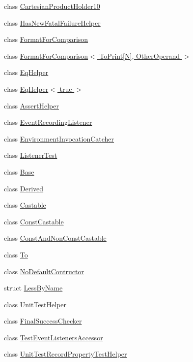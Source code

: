 \begin{DoxyCompactItemize}
\item 
class \hyperlink{classtesting_1_1internal_1_1_cartesian_product_holder10}{Cartesian\-Product\-Holder10}
\item 
class \hyperlink{classtesting_1_1internal_1_1_has_new_fatal_failure_helper}{Has\-New\-Fatal\-Failure\-Helper}
\item 
class \hyperlink{classtesting_1_1internal_1_1_format_for_comparison}{Format\-For\-Comparison}
\item 
class \hyperlink{classtesting_1_1internal_1_1_format_for_comparison_3_01_to_print[_n]_00_01_other_operand_01_4}{Format\-For\-Comparison$<$ To\-Print\mbox{[}\-N\mbox{]}, Other\-Operand $>$}
\item 
class \hyperlink{classtesting_1_1internal_1_1_eq_helper}{Eq\-Helper}
\item 
class \hyperlink{classtesting_1_1internal_1_1_eq_helper_3_01true_01_4}{Eq\-Helper$<$ true $>$}
\item 
class \hyperlink{classtesting_1_1internal_1_1_assert_helper}{Assert\-Helper}
\item 
class \hyperlink{classtesting_1_1internal_1_1_event_recording_listener}{Event\-Recording\-Listener}
\item 
class \hyperlink{classtesting_1_1internal_1_1_environment_invocation_catcher}{Environment\-Invocation\-Catcher}
\item 
class \hyperlink{classtesting_1_1internal_1_1_listener_test}{Listener\-Test}
\item 
class \hyperlink{classtesting_1_1internal_1_1_base}{Base}
\item 
class \hyperlink{classtesting_1_1internal_1_1_derived}{Derived}
\item 
class \hyperlink{classtesting_1_1internal_1_1_castable}{Castable}
\item 
class \hyperlink{classtesting_1_1internal_1_1_const_castable}{Const\-Castable}
\item 
class \hyperlink{classtesting_1_1internal_1_1_const_and_non_const_castable}{Const\-And\-Non\-Const\-Castable}
\item 
class \hyperlink{classtesting_1_1internal_1_1_to}{To}
\item 
class \hyperlink{classtesting_1_1internal_1_1_no_default_contructor}{No\-Default\-Contructor}
\item 
struct \hyperlink{structtesting_1_1internal_1_1_less_by_name}{Less\-By\-Name}
\item 
class \hyperlink{classtesting_1_1internal_1_1_unit_test_helper}{Unit\-Test\-Helper}
\item 
class \hyperlink{classtesting_1_1internal_1_1_final_success_checker}{Final\-Success\-Checker}
\item 
class \hyperlink{classtesting_1_1internal_1_1_test_event_listeners_accessor}{Test\-Event\-Listeners\-Accessor}
\item 
class \hyperlink{classtesting_1_1internal_1_1_unit_test_record_property_test_helper}{Unit\-Test\-Record\-Property\-Test\-Helper}
\end{DoxyCompactItemize}
